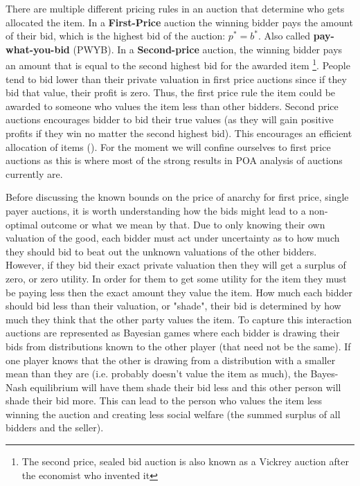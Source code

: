 \documentclass[12pt,twoside]{reedthesis}
\begin{document}
There are multiple different pricing rules in an auction that determine who gets allocated the item. In a \textbf{First-Price} auction the winning bidder pays the amount of their bid, which is the highest bid of the auction: $p^* = b^*$. Also called \textbf{pay-what-you-bid} (PWYB). In a \textbf{Second-price} auction, the winning bidder pays an amount that is equal to the second highest bid for the awarded item \cite{Vickrey1961} \footnote{The second price, sealed bid auction is also known as a Vickrey auction after the economist who invented it}. People tend to bid lower than their private valuation in first price auctions since if they bid that value, their profit is zero. Thus, the first price rule the item could be awarded to someone who values the item less than other bidders. Second price auctions encourages bidder to bid their true values (as they will gain positive profits if they win no matter the second highest bid). This encourages an efficient allocation of items (\cite{Mochon2015}). For the moment we will confine ourselves to first price auctions as this is where most of the strong results in POA analysis of auctions currently are.

Before discussing the known bounds on the price of anarchy for first price, single payer auctions, it is worth understanding how the bids might lead to a non-optimal outcome or what we mean by that. Due to only knowing their own valuation of the good, each bidder must act under uncertainty as to how much they should bid to beat out the unknown valuations of the other bidders. However, if they bid their exact private valuation then they will get a surplus of zero, or zero utility. In order for them to get some utility for the item they must be paying less then the exact amount they value the item. How much each bidder should bid less than their valuation, or "shade", their bid is determined by how much they think that the other party values the item. To capture this interaction auctions are represented as Bayesian games where each bidder is drawing their bids from distributions known to the other player (that need not be the same). If one player knows that the other is drawing from a distribution with a smaller mean than they are (i.e. probably doesn't value the item as much), the Bayes-Nash equilibrium will have them shade their bid less and this other person will shade their bid more. This can lead to the person who values the item less winning the auction and creating less social welfare (the summed surplus of all bidders and the seller). 
\end{document}
